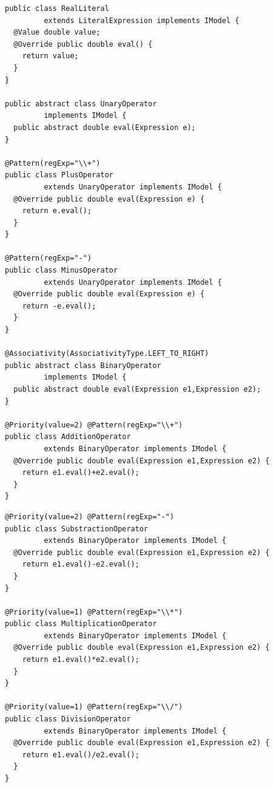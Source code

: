 \documentclass[a4paper,twoside,onecolumn]{article}
\newenvironment{colframe}{%
  \begin{Sbox} 
    \begin{minipage}{.8\columnwidth} 
}{%

  \end{minipage} 
  \end{Sbox} 
  \begin{center} 
    \fcolorbox{black}{MyGray}{\TheSbox} 
  \end{center} 
}
\begin{document}
\begin{colframe}
\begin{verbatim}
public class RealLiteral
         extends LiteralExpression implements IModel {
  @Value double value;
  @Override public double eval() {
    return value;
  }
}

public abstract class UnaryOperator
         implements IModel {
  public abstract double eval(Expression e);
}

@Pattern(regExp="\\+")
public class PlusOperator
         extends UnaryOperator implements IModel {
  @Override public double eval(Expression e) {
    return e.eval();
  }
}

@Pattern(regExp="-")
public class MinusOperator
         extends UnaryOperator implements IModel {
  @Override public double eval(Expression e) {
    return -e.eval();
  }
}

@Associativity(AssociativityType.LEFT_TO_RIGHT)
public abstract class BinaryOperator
         implements IModel {
  public abstract double eval(Expression e1,Expression e2);
}

@Priority(value=2) @Pattern(regExp="\\+")
public class AdditionOperator
         extends BinaryOperator implements IModel {
  @Override public double eval(Expression e1,Expression e2) {
    return e1.eval()+e2.eval();
  }
}
\end{verbatim}
\end{colframe}

\begin{colframe}
\begin{verbatim}
@Priority(value=2) @Pattern(regExp="-")
public class SubstractionOperator
         extends BinaryOperator implements IModel {
  @Override public double eval(Expression e1,Expression e2) {
    return e1.eval()-e2.eval();
  }
}

@Priority(value=1) @Pattern(regExp="\\*")
public class MultiplicationOperator
         extends BinaryOperator implements IModel {
  @Override public double eval(Expression e1,Expression e2) {
    return e1.eval()*e2.eval();
  }
}

@Priority(value=1) @Pattern(regExp="\\/")
public class DivisionOperator
         extends BinaryOperator implements IModel {
  @Override public double eval(Expression e1,Expression e2) {
    return e1.eval()/e2.eval();
  }
}
\end{verbatim}
\end{colframe}
\end{document}

